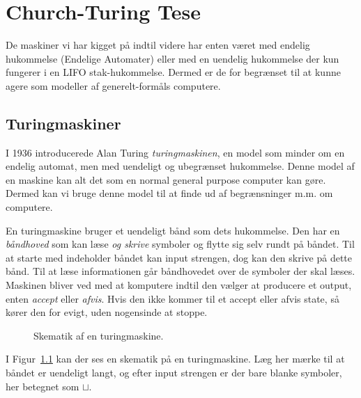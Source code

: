 \chapter{Church-Turing Tese}

De maskiner vi har kigget på indtil videre har enten været med endelig hukommelse (Endelige Automater) eller med en uendelig hukommelse der kun fungerer i en LIFO stak-hukommelse. Dermed er de for begrænset til at kunne agere som modeller af generelt-formåls computere.

\section{Turingmaskiner}%
\label{sec:turingmachines}

I 1936 introducerede Alan Turing \textit{turingmaskinen}, en model som minder om en endelig automat, men med uendeligt og ubegrænset hukommelse. Denne model af en maskine kan alt det som en normal general purpose computer kan gøre. Dermed kan vi bruge denne model til at finde ud af begrænsninger m.m. om computere.

En turingmaskine bruger et uendeligt bånd som dets hukommelse. Den har en \textit{båndhoved} som kan læse \textit{og skrive} symboler og flytte sig selv rundt på båndet. Til at starte med indeholder båndet kan input strengen, dog kan den skrive på dette bånd. Til at læse informationen går båndhovedet over de symboler der skal læses. Maskinen bliver ved med at komputere indtil den vælger at producere et output, enten \textit{accept} eller \textit{afvis}. Hvis den ikke kommer til et accept eller afvis state, så kører den for evigt, uden nogensinde at stoppe.

\begin{figure}[ht]
  \centering
  \caption{\label{fig:turingschematic} Skematik af en turingmaskine.}
\end{figure}
I Figur~\ref{fig:turingschematic} kan der ses en skematik på en turingmaskine. Læg her mærke til at båndet er uendeligt langt, og efter input strengen er der bare blanke symboler, her betegnet som $\sqcup$.

